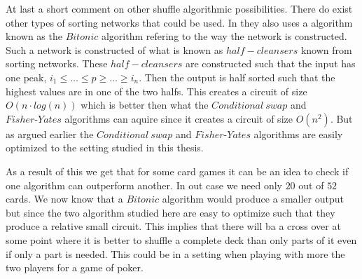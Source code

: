 At last a short comment on other shuffle algorithmic possibilities. There do exist other types of sorting networks that could be used. In  they also uses a algorithm known as the $Bitonic$ algorithm refering to the way the network is constructed. Such a network is constructed of what is known as $half-cleansers$ known from sorting networks. These $half-cleansers$ are constructed such that the input has one peak, $i_1\leq \dots \leq p \geq \dots \geq i_n$. Then the output is half sorted such that the highest values are in one of the two halfs. This creates a circuit of size $O(n\cdot log(n))$ which is better then what the $Conditional~swap$ and $Fisher\text{-}Yates$ algorithms can aquire since it creates a circuit of size $O(n^2)$. But as argued earlier the $Conditional~swap$ and $Fisher\text{-}Yates$ algorithms are easily optimized to the setting studied in this thesis.


As a result of this we get that for some card games it can be an idea to check if one algorithm can outperform another. In out case we need only $20$ out of $52$ cards. We now know that a $Bitonic$ algorithm would produce a smaller output but since the two algorithm studied here are easy to optimize such that they produce a relative small circuit. This implies that there will ba a cross over at some point where it is better to shuffle a complete deck than only parts of it even if only a part is needed. This could be in a setting when playing with more the two players for a game of poker.